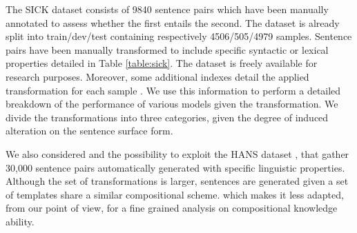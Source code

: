 The SICK dataset \parencite{marelli_14} consists of 9840 sentence pairs which have been manually annotated to assess whether the first entails the second. The dataset is already split into train/dev/test containing respectively 4506/505/4979 samples. Sentence pairs have been manually transformed to include specific syntactic or lexical properties detailed in Table \ref{table:sick}. The dataset is freely available for research purposes. Moreover, some additional indexes detail the applied transformation for each sample
. We use this information to perform a detailed breakdown of the performance of various models given the transformation. We divide the transformations into three categories, given the degree of induced alteration on the sentence surface form.

We also considered and the possibility to exploit the HANS dataset \parencite{mccoy_19}, that gather 30,000 sentence pairs automatically generated with specific linguistic properties. Although the set of transformations is larger, sentences are generated given a set of templates share a similar compositional scheme.  which makes it less adapted, from our point of view, for a fine grained analysis on compositional knowledge ability.


